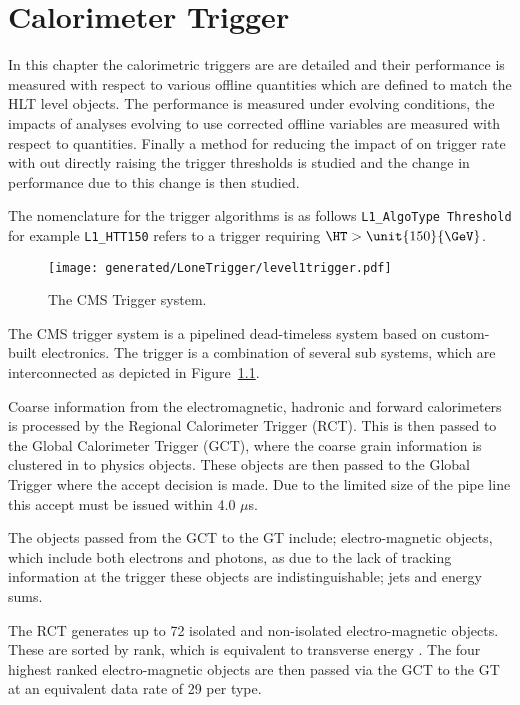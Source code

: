 \chapter{\Lone Calorimeter Trigger} %
\label{cha:level_one_trigger}
In this chapter the \Lone calorimetric triggers are are detailed and their performance is measured with respect to various offline quantities which are defined to match the HLT level objects. The performance is measured under evolving \pu conditions, the impacts of analyses evolving to use \pu corrected offline variables are measured with respect to \Lone quantities. Finally a method for reducing the impact of \pu on \Lone trigger rate with out directly raising the trigger thresholds is studied and the change in performance due to this change is then studied.

The nomenclature for the \Lone trigger algorithms is as follows \verb|L1_AlgoType Threshold| for example \verb|L1_HTT150| refers to a \Lone trigger requiring $\HT > \unit{150}{\GeV}$.

\begin{figure}[ht]
  \centering
    \texttt{[image: generated/LoneTrigger/level1trigger.pdf]}
  \caption{The CMS \Lone Trigger system.}
  \label{fig:figures_LoneTrigger_level1trigger}
\end{figure}

The CMS \Lone trigger system\cite{l1} is a pipelined dead-timeless system based 
on custom-built electronics.
The \Lone trigger is a combination of several sub systems, which are 
interconnected as depicted in 
Figure~\ref{fig:figures_LoneTrigger_level1trigger}.

Coarse information from the electromagnetic, hadronic and forward 
calorimeters is processed by the Regional Calorimeter Trigger (RCT). This is 
then passed to the Global Calorimeter Trigger (GCT), where the coarse grain 
information is clustered in to physics objects. These objects are then passed 
to the Global Trigger where the \Lone accept decision is made. Due to the 
limited size of the pipe line this \Lone accept must be issued within 4.0 
$\mu$s.

The objects passed from the GCT to the GT include; electro-magnetic objects,
which include both electrons and photons, as due to the lack of tracking 
information at the \Lone trigger these objects are indistinguishable; jets and 
energy sums.

The RCT generates up to 72 isolated and non-isolated electro-magnetic objects. 
These are sorted by rank, which is equivalent to transverse energy \ET. The 
four highest ranked electro-magnetic objects are then passed via the GCT to the 
GT at an equivalent data rate of 29 \Gbs per type.

